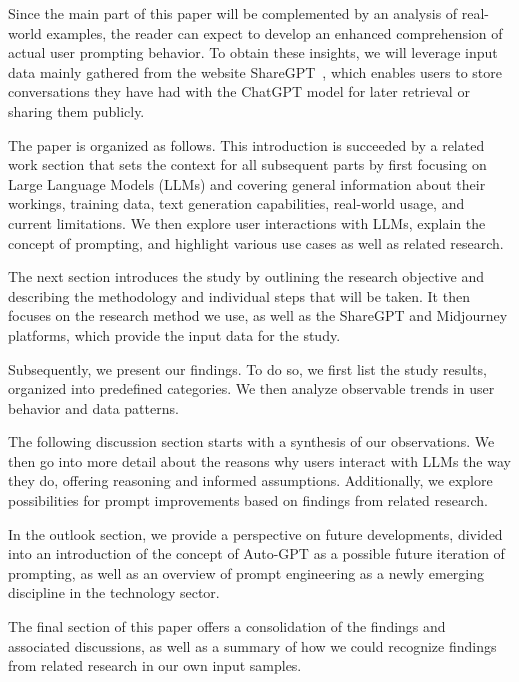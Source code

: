 Since the main part of this paper will be complemented by an analysis of real-world examples, the
reader can expect to develop an enhanced comprehension of actual user prompting behavior.
To obtain these insights, we will leverage input data mainly gathered from the website
ShareGPT~\cite{sharegpt_sharegpt_2023},
which enables users to store conversations they have had with the ChatGPT model for later retrieval
or sharing them publicly.

The paper is organized as follows.
This introduction is succeeded by a related work section that sets the context for all subsequent
parts by first focusing on Large Language Models (LLMs) and covering general information about
their workings, training data, text generation capabilities, real-world usage, and current limitations.
We then explore user interactions with LLMs, explain the concept of prompting, and highlight
various use cases as well as related research.

The next section introduces the study by outlining the research objective and
describing the methodology and individual steps that will be taken.
It then focuses on the research method we use, as well as the ShareGPT and Midjourney platforms,
which provide the input data for the study.

Subsequently, we present our findings.
To do so, we first list the study results, organized into predefined categories.
We then analyze observable trends in user behavior and data patterns.

The following discussion section starts with a synthesis of our observations.
We then go into more detail about the reasons why users interact with LLMs the way they do,
offering reasoning and informed assumptions.
Additionally, we explore possibilities for prompt improvements based on findings from related
research.

In the outlook section, we provide a perspective on future developments, divided into an
introduction of the concept of Auto-GPT as a possible future iteration of prompting, as well as an
overview of prompt engineering as a newly emerging discipline in the technology sector.

The final section of this paper offers a consolidation of the findings and associated discussions,
as well as a summary of how we could recognize findings from related research in our own input
samples.